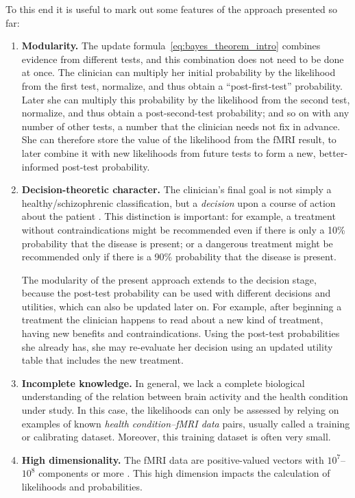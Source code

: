 \documentclass[%
]{frontiersSCNS-nologo} %
\newcommand*{\chaps}{chs} %
\renewcommand*{\|}{\mathpunct{|}}%
\begin{document}
To this end it is useful to mark out some features of the
approach presented so far:
\begin{enumerate}[wide,label=\Roman*.]
\item\label{item:test_combination}\textbf{Modularity.} The update
  formula~\eqref{eq:bayes_theorem_intro} combines evidence from different
  tests, and this combination does not need to be done at once. The
  clinician can multiply her initial probability by the likelihood from the
  first test, normalize, and thus obtain a \enquote{post-first-test}
%
  probability. Later she can multiply this probability by the likelihood
  from the second test, normalize, and thus obtain a post-second-test
  probability; and so on with any number of other tests, a number that the
  clinician needs not fix in advance. She can therefore store the value of
  the likelihood from the fMRI result, to later combine it with new
  likelihoods from future tests to form a new, better-informed post-test
  probability.

\item\label{item:no_classif}\textbf{Decision-theoretic character.} The
  clinician's final goal is not simply a healthy/schizophrenic
  classification, but a \emph{decision} upon a course of action about the
  patient \citetext{\citealp[\chaps~6, 7]{soxetal1988_r2013};
    \citealp[\chaps~13, 14]{jaynes1994_r2003};
    \citealp{raiffaetal1961_r2000}}. This distinction is important: for
  example, a treatment without contraindications might be recommended even
  if there is only a 10\% probability that the disease is present; or a
  dangerous treatment might be recommended only if there is a 90\%
  probability that the disease is present.

  The modularity of the present approach extends to the decision stage,
  because the post-test probability can be used with different decisions
  and utilities, which can also be updated later on. For example, after
  beginning a treatment the clinician happens to read about a new kind of
  treatment, having new benefits and contraindications. Using the post-test
  probabilities she already has, she may re-evaluate her decision using an
  updated utility table that includes the new treatment.

\item\label{item:learning}\textbf{Incomplete knowledge.} In general, we lack a complete
  biological understanding of the relation between brain activity and the
  health condition under study. In this case, the likelihoods can only be
  assessed by relying on examples of known \emph{health condition--fMRI
    data} pairs, usually called a training or calibrating dataset. Moreover, this
  training dataset is often very small.
  
\item\label{item:large_dataspace}\textbf{High dimensionality.} The 
  fMRI data are positive-valued vectors with
  $10^7$--$10^8$ components or more \citep{lindquist2008}. This high
  dimension impacts the calculation of likelihoods and probabilities.
\end{enumerate}
\end{document}
